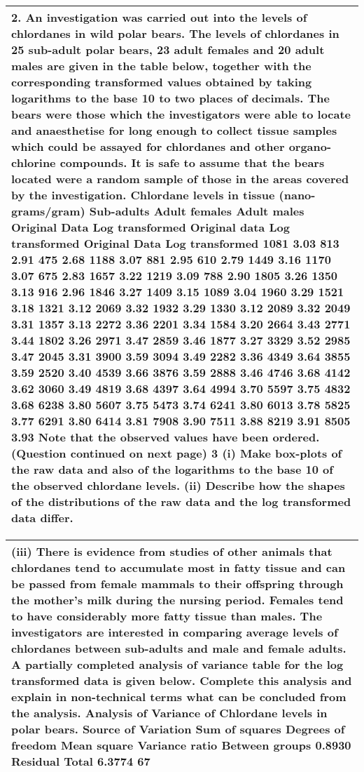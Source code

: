 \documentclass[a4paper,12pt]{article}
\begin{document}
\begin{table}[ht!]
 \centering
 \begin{tabular}{|p{15cm}|}
 \hline  
2. An investigation was carried out into the levels of chlordanes in wild polar bears. The levels of chlordanes in 25 sub-adult polar bears, 23 adult females and 20 adult males are given in the table below, together with the corresponding transformed values obtained by taking logarithms to the base 10 to two places of decimals. The bears were those which the investigators were able to locate and anaesthetise for long enough to collect tissue samples which could be assayed for chlordanes and other organo-chlorine compounds. It is safe to assume that the bears located were a random sample of those in the areas covered by the investigation.
Chlordane levels in tissue (nano-grams/gram) Sub-adults Adult females Adult males Original Data Log transformed Original data Log transformed Original Data Log transformed 1081 3.03 813 2.91 475 2.68 1188 3.07 881 2.95 610 2.79 1449 3.16 1170 3.07 675 2.83 1657 3.22 1219 3.09 788 2.90 1805 3.26 1350 3.13 916 2.96 1846 3.27 1409 3.15 1089 3.04 1960 3.29 1521 3.18 1321 3.12 2069 3.32 1932 3.29 1330 3.12 2089 3.32 2049 3.31 1357 3.13 2272 3.36 2201 3.34 1584 3.20 2664 3.43 2771 3.44 1802 3.26 2971 3.47 2859 3.46 1877 3.27 3329 3.52 2985 3.47 2045 3.31 3900 3.59 3094 3.49 2282 3.36 4349 3.64 3855 3.59 2520 3.40 4539 3.66 3876 3.59 2888 3.46 4746 3.68 4142 3.62 3060 3.49 4819 3.68 4397 3.64 4994 3.70 5597 3.75 4832 3.68 6238 3.80 5607 3.75 5473 3.74 6241 3.80 6013 3.78 5825 3.77 6291 3.80 6414 3.81 7908 3.90 7511 3.88 8219 3.91 8505 3.93
Note that the observed values have been ordered.
(Question continued on next page)
3
(i) Make box-plots of the raw data and also of the logarithms to the base 10 of the observed chlordane levels.
(ii) Describe how the shapes of the distributions of the raw data and the log transformed data differ.
\\ \hline
  \end{tabular}
\end{table}

\begin{table}[ht!]
 \centering
 \begin{tabular}{|p{15cm}|}
 \hline  


(iii) There is evidence from studies of other animals that chlordanes tend to accumulate most in fatty tissue and can be passed from female mammals to their offspring through the mother's milk during the nursing period. Females tend to have considerably more fatty tissue than males. The investigators are interested in comparing average levels of chlordanes between sub-adults and male and female adults. A partially completed analysis of variance table for the log transformed data is given below. Complete this analysis and explain in non-technical terms what can be concluded from the analysis.
Analysis of Variance of Chlordane levels in polar bears.
Source of Variation
Sum of squares
Degrees of freedom
Mean square
Variance ratio
Between groups 0.8930 Residual Total 6.3774 67

\\ \hline
  \end{tabular}
\end{table}
\end{document}
